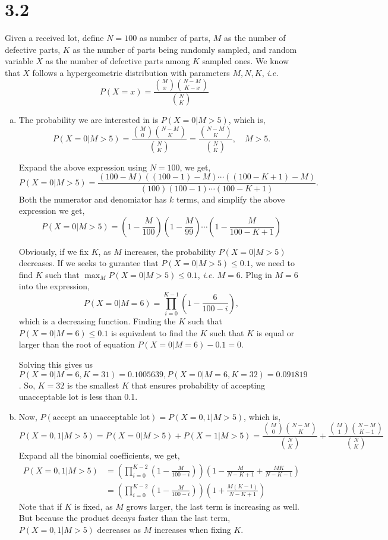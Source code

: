 \documentclass[letter]{article}
\begin{document}
    \section*{3.2}
    Given a received lot, define $N=100$ as number of parts, $M$ as the number of defective parts, $K$ as the number of parts being randomly sampled, and random variable $X$ as the number of defective parts among $K$ sampled ones.
    We know that $X$ follows a hypergeometric distribution with parameters $M, N, K$, \emph{i.e.}
    \[
    P(X = x) = \frac{\binom{M}{x} \binom{N-M}{K-x}}{\binom{N}{K}}
    \]
    \begin{enumerate}[(a)]
    \item The probability we are interested in is $P(X=0|M>5)$, which is,
    \[
    P(X=0|M>5) = \frac{\binom{M}{0} \binom{N-M}{K}}{\binom{N}{K}} 
    = \frac{\binom{N-M}{K}}{\binom{N}{K}}, \quad M>5.
    \]

    Expand the above expression using $N=100$, we get,
    \[
    P(X=0|M>5) = \frac{(100-M)((100-1)-M)\cdots((100-K+1)-M)}{(100)(100-1)\cdots(100-K+1)}.
    \]
    Both the numerator and denomiator has $k$ terms, and simplify the above expression we get,
    \[
    P(X=0|M>5) = (1-\frac{M}{100})(1-\frac{M}{99})\cdots(1-\frac{M}{100-K+1})
    \]

    Obviously, if we fix $K$, as $M$ increases, the probability $P(X=0|M>5)$ decreases. If we seeks to gurantee that $P(X=0|M>5) \le 0.1$, we need to find $K$ such that $\max_{M} P(X=0|M>5) \le 0.1$, \emph{i.e.} $M=6$.
    Plug in $M=6$ into the expression, 
    \[
    P(X=0|M=6) = \prod_{i=0}^{K-1} \left(1-\frac{6}{100-i}\right),
    \]
    which is a decreasing function. Finding the $K$ such that $P(X=0|M=6) \le 0.1$ is equivalent to find the $K$ such that $K$ is equal or larger than the root of equation $P(X=0|M=6) - 0.1 = 0$.
    
    Solving this gives us $P(X=0|M=6,K=31)=0.1005639, P(X=0|M=6,K=32)=0.091819$. So, $K=32$ is the smallest $K$ that ensures probability of accepting unacceptable lot is less than 0.1.

    \item Now, $P(\text{accept an unacceptable lot}) = P(X=0,1|M>5)$, which is,
    \[
    P(X=0,1|M>5) = P(X=0|M>5) + P(X=1|M>5) 
    = \frac{\binom{M}{0}\binom{N-M}{K}}{\binom{N}{K}} + \frac{\binom{M}{1}\binom{N-M}{K-1}}{\binom{N}{K}}
    \]
    Expand all the binomial coefficients, we get,
    \begin{align*}
    P(X=0,1|M>5) & =  \left(\prod_{i=0}^{K-2} \left(1-\frac{M}{100-i}\right)\right) \left(1 - \frac{M}{N-K+1} + \frac{MK}{N-K-1}\right)\\
    & = \left(\prod_{i=0}^{K-2} \left(1-\frac{M}{100-i}\right)\right) \left(1+\frac{M(K-1)}{N-K+1}\right)
    \end{align*}
    Note that if $K$ is fixed, as $M$ grows larger, the last term is increasing as well. But because the product decays faster than the last term, $P(X=0,1|M>5)$ decreases as $M$ increases when fixing $K$.


\end{enumerate}
\end{document}
